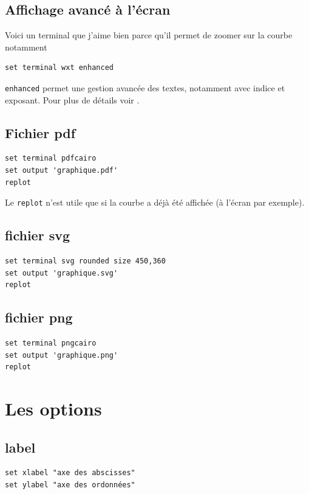 \documentclass[a4paper,twoside]{article}
\begin{document}
\subsection{Affichage avancé à l'écran}
Voici un terminal que j'aime bien parce qu'il permet de zoomer sur la courbe notamment

\begin{verbatim}
set terminal wxt enhanced
\end{verbatim}

\begin{remarque}
\texttt{enhanced} permet une gestion avancée des textes, notamment avec indice et exposant. Pour plus de détails voir .
\end{remarque}


\subsection{Fichier pdf}
\begin{verbatim}
set terminal pdfcairo
set output 'graphique.pdf'
replot
\end{verbatim}

\begin{remarque}
Le \texttt{replot} n'est utile que si la courbe a déjà été affichée (à l'écran par exemple).
\end{remarque}

\subsection{fichier svg}
\begin{verbatim}
set terminal svg rounded size 450,360
set output 'graphique.svg'
replot
\end{verbatim}

\subsection{fichier png}
\begin{verbatim}
set terminal pngcairo
set output 'graphique.png'
replot
\end{verbatim}


\section{Les options}
\subsection{label}
\begin{verbatim}
set xlabel "axe des abscisses"
set ylabel "axe des ordonnées"
\end{verbatim}
\end{document}
